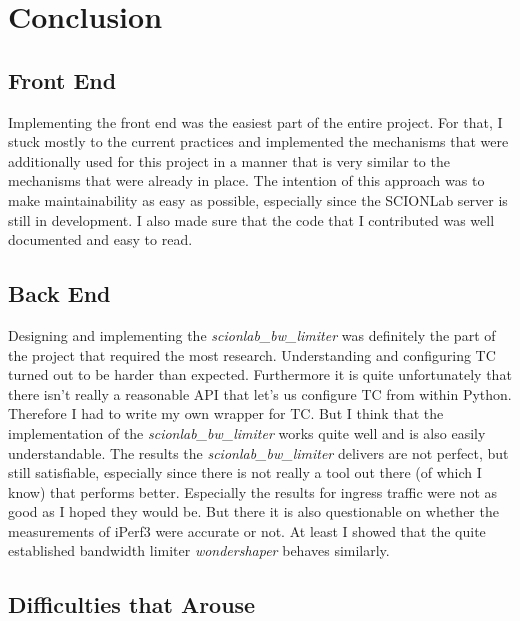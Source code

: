 \chapter{Conclusion}
\section{Front End}

Implementing the front end was the easiest part of the entire project. For that, I stuck mostly to the current practices and implemented the mechanisms that were additionally used for this project in a manner that is very similar to the mechanisms that were already in place. The intention of this approach was to make maintainability as easy as possible, especially since the \acs{SCIONLab} server is still in development. I also made sure that the code that I contributed was well documented and easy to read.

\section{Back End}

Designing and implementing the \textit{scionlab\_bw\_limiter} was definitely the part of the project that required the most research. Understanding and configuring \acs{TC} turned out to be harder than expected. Furthermore it is quite unfortunately that there isn't really a reasonable \acs{API} that let's us configure \acs{TC} from within Python. Therefore I had to write my own wrapper for \acs{TC}. But I think that the implementation of the \textit{scionlab\_bw\_limiter} works quite well and is also easily understandable. The results the \textit{scionlab\_bw\_limiter} delivers are not perfect, but still satisfiable, especially since there is not really a tool out there (of which I know) that performs better. Especially the results for ingress traffic were not as good as I hoped they would be. But there it is also questionable on whether the measurements of iPerf3 were accurate or not. At least I showed that the quite established bandwidth limiter \textit{wondershaper} behaves similarly.

\section{Difficulties that Arouse}

